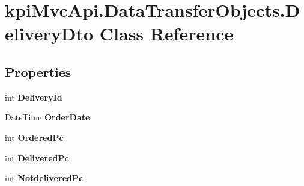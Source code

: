 \hypertarget{classkpi_mvc_api_1_1_data_transfer_objects_1_1_delivery_dto}{}\section{kpi\+Mvc\+Api.\+Data\+Transfer\+Objects.\+Delivery\+Dto Class Reference}
\label{classkpi_mvc_api_1_1_data_transfer_objects_1_1_delivery_dto}
\subsection*{Properties}
\begin{DoxyCompactItemize}
\item 
\mbox{\label{classkpi_mvc_api_1_1_data_transfer_objects_1_1_delivery_dto_abfa55f92ce2eb311f109bbf00adf0fae}} 
int {\bfseries Delivery\+Id}
\item 
\mbox{\label{classkpi_mvc_api_1_1_data_transfer_objects_1_1_delivery_dto_a55b63a4dd02ad1ac985c5e14c074f844}} 
Date\+Time {\bfseries Order\+Date}
\item 
\mbox{\label{classkpi_mvc_api_1_1_data_transfer_objects_1_1_delivery_dto_a8aee4a265f39d1065f7ce062a9d612fb}} 
int {\bfseries Ordered\+Pc}
\item 
\mbox{\label{classkpi_mvc_api_1_1_data_transfer_objects_1_1_delivery_dto_a307da11b2af0c2faa34c8306bd9aae5b}} 
int {\bfseries Delivered\+Pc}
\item 
\mbox{\label{classkpi_mvc_api_1_1_data_transfer_objects_1_1_delivery_dto_aa15e3fa45b13f2d466ec060e65c3932d}} 
int {\bfseries Notdelivered\+Pc}

\end{DoxyCompactItemize}
